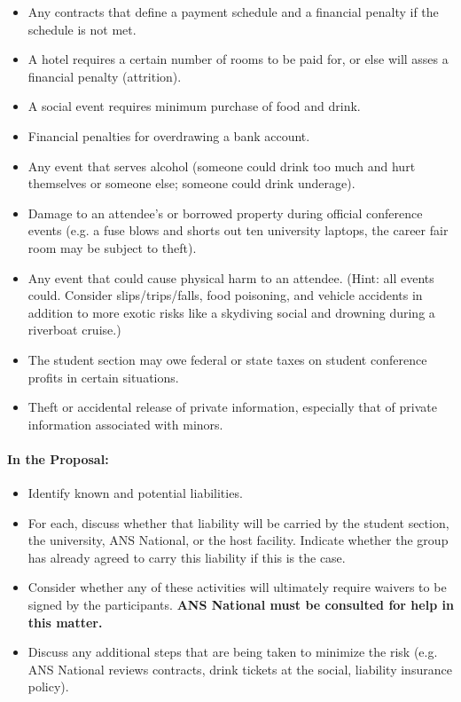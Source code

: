 \documentclass[12pt]{article}
\begin{document}
\begin{itemize}
\item{Any contracts that define a payment schedule and a financial penalty if the schedule is not met.}
\item{A hotel requires a certain number of rooms to be paid for, or else will asses a financial penalty (attrition).}
\item{A social event requires minimum purchase of food and drink.}
\item{Financial penalties for overdrawing a bank account.}
\item{Any event that serves alcohol (someone could drink too much and hurt themselves or someone else; someone could drink underage).}
\item{Damage to an attendee's or borrowed property during official conference events (e.g. a fuse blows and shorts out ten university laptops, the career fair room may be subject to theft).}
\item{Any event that could cause physical harm to an attendee. (Hint: all events could. Consider slips/trips/falls, food  poisoning, and vehicle accidents in addition to more exotic risks like a skydiving social and drowning during a riverboat cruise.)}
\item{The student section may owe federal or state taxes on student conference profits in certain situations.}
\item{Theft or accidental release of private information, especially that of private information associated with minors.}
\end{itemize}


\paragraph{In the Proposal:}
\begin{itemize}
\item{Identify known and potential liabilities.}
\item{For each, discuss whether that liability will be carried by the student section, the university, ANS National, or the host facility. Indicate whether the group has already agreed to carry this liability if this is the case.}
\item{Consider whether any of these activities will ultimately require waivers to be signed by the participants. \textbf{ANS National must be consulted for help in this matter.}}
\item{Discuss any additional steps that are being taken to minimize the risk (e.g. ANS National reviews contracts, drink tickets at the social, liability insurance policy).}
\end{itemize}
\end{document}
